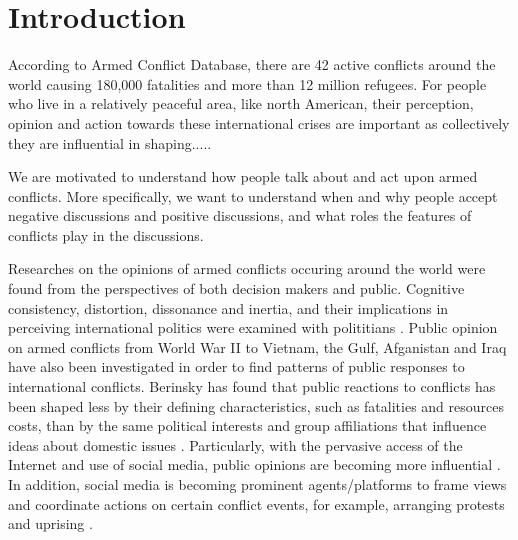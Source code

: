 \section{Introduction}
According to Armed Conflict Database, there are 42 active conflicts around the world causing 180,000 fatalities and more than 12 million refugees. For people who live in a relatively peaceful area, like north American, their perception, opinion and action towards these international crises are important as collectively they are influential in shaping..... 

We are motivated to understand how people talk about and act upon armed conflicts. More specifically, we want to understand when and why people accept negative discussions and positive discussions, and what roles the features of conflicts play in the discussions.

Researches on the opinions of armed conflicts occuring around the world were found from the perspectives of both decision makers and public. Cognitive consistency, distortion, dissonance and inertia, and their implications in perceiving international politics were examined with polititians \cite{Jervis1976}. Public opinion on armed conflicts from World War II to Vietnam, the Gulf, Afganistan and Iraq have also been investigated in order to find patterns of public responses to international conflicts. Berinsky has found that public reactions to conflicts has been shaped less by their defining characteristics, such as fatalities and resources costs, than by the same political interests and group affiliations that influence ideas about domestic issues \cite{Berinsky2009}. Particularly, with the pervasive access of the Internet and use of social media, public opinions are becoming more influential \cite{Shirky2011}. In addition, social media is becoming prominent agents/platforms to frame views and coordinate actions on certain conflict events, for example, arranging protests and uprising \cite{Lim2012}.